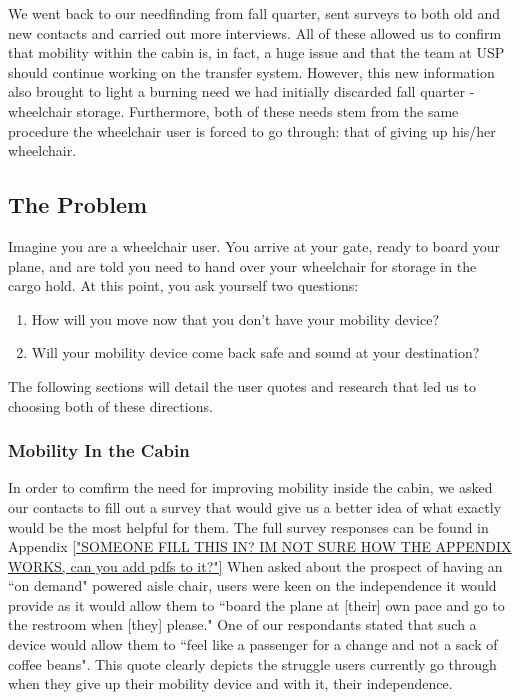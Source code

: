 We went back to our needfinding from fall quarter, sent surveys to both old and new contacts and carried out more interviews. All of these allowed us to confirm that mobility within the cabin is, in fact, a huge issue and that the team at USP should continue working on the transfer system. However, this new information also brought to light a burning need we had initially discarded fall quarter - wheelchair storage. Furthermore, both of these needs stem from the same procedure the wheelchair user is forced to go through: that of giving up his/her wheelchair. 

\subsection{The Problem}

Imagine you are a wheelchair user. You arrive at your gate, ready to board your plane, and are told you need to hand over your wheelchair for storage in the cargo hold. At this point, you ask yourself two questions: 
\begin{enumerate}
	\item How will you move now that you don't have your mobility device? 
	\item Will your mobility device come back safe and sound at your destination?
\end{enumerate}
The following sections will detail the user quotes and research that led us to choosing both of these directions.  
\\

\subsubsection{Mobility In the Cabin}

In order to comfirm the need for improving mobility inside the cabin, we asked our contacts to fill out a survey that would give us a better idea of what exactly would be the most helpful for them. The full survey responses can be found in Appendix \ref{"SOMEONE FILL THIS IN? IM NOT SURE HOW THE APPENDIX WORKS, can you add pdfs to it?"} 
When asked about the prospect of having an ``on demand"  powered aisle chair, users were keen on the independence it would provide as it would allow them to ``board the plane at [their] own pace and go to the restroom when [they] please." One of our respondants stated that such a device would allow them to ``feel like a passenger for a change and not a sack of coffee beans". This quote clearly depicts the struggle users currently go through when they give up their mobility device and with it, their independence.

